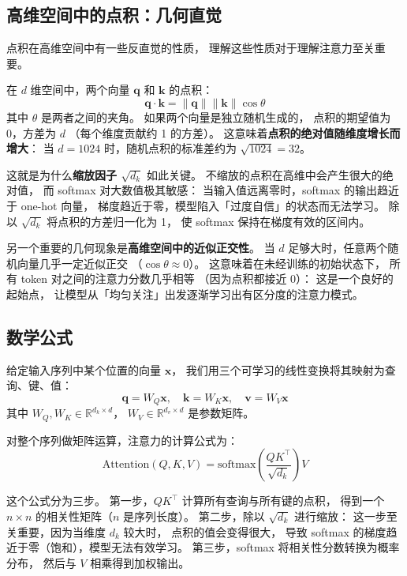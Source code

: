 \subsection{高维空间中的点积：几何直觉}

点积在高维空间中有一些反直觉的性质，
理解这些性质对于理解注意力至关重要。

在 $d$ 维空间中，两个向量 $\mathbf{q}$ 和 $\mathbf{k}$ 的点积：
\[
  \mathbf{q} \cdot \mathbf{k} = \|\mathbf{q}\| \|\mathbf{k}\| \cos\theta
\]
其中 $\theta$ 是两者之间的夹角。
如果两个向量是独立随机生成的，
点积的期望值为 0，方差为 $d$
（每个维度贡献约 1 的方差）。
这意味着\textbf{点积的绝对值随维度增长而增大}：
当 $d = 1024$ 时，随机点积的标准差约为 $\sqrt{1024} = 32$。

这就是为什么\textbf{缩放因子 $\sqrt{d_k}$} 如此关键。
不缩放的点积在高维中会产生很大的绝对值，
而 softmax 对大数值极其敏感：
当输入值远离零时，softmax 的输出趋近于 one-hot 向量，
梯度趋近于零，模型陷入「过度自信」的状态而无法学习。
除以 $\sqrt{d_k}$ 将点积的方差归一化为 1，
使 softmax 保持在梯度有效的区间内。

另一个重要的几何现象是\textbf{高维空间中的近似正交性}。
当 $d$ 足够大时，任意两个随机向量几乎一定近似正交
（$\cos\theta \approx 0$）。
这意味着在未经训练的初始状态下，
所有 token 对之间的注意力分数几乎相等
（因为点积都接近 0）：
这是一个良好的起始点，
让模型从「均匀关注」出发逐渐学习出有区分度的注意力模式。

\subsection{数学公式}

给定输入序列中某个位置的向量 $\mathbf{x}$，
我们用三个可学习的线性变换将其映射为查询、键、值：
\begin{equation}
  \mathbf{q} = W_Q \mathbf{x}, \quad
  \mathbf{k} = W_K \mathbf{x}, \quad
  \mathbf{v} = W_V \mathbf{x}
\end{equation}
其中 $W_Q, W_K \in \mathbb{R}^{d_k \times d}$，
$W_V \in \mathbb{R}^{d_v \times d}$ 是参数矩阵。

对整个序列做矩阵运算，注意力的计算公式为：
\begin{equation}
  \mathrm{Attention}(Q, K, V)
  = \mathrm{softmax}\!\left(\frac{Q K^\top}{\sqrt{d_k}}\right) V
  \label{eq:attention}
\end{equation}

这个公式分为三步。
第一步，$QK^\top$ 计算所有查询与所有键的点积，
得到一个 $n \times n$ 的相关性矩阵（$n$ 是序列长度）。
第二步，除以 $\sqrt{d_k}$ 进行缩放：
这一步至关重要，因为当维度 $d_k$ 较大时，
点积的值会变得很大，
导致 softmax 的梯度趋近于零（饱和），模型无法有效学习。
第三步，softmax 将相关性分数转换为概率分布，
然后与 $V$ 相乘得到加权输出。

